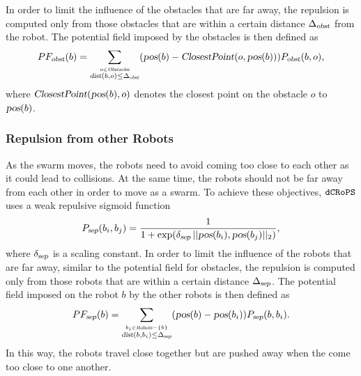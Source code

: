 \documentclass[letterpaper, 10pt, conference]{ieeeconf}
\newcommand{\Acronym}[1]{\ensuremath{{\small{\texttt{#1}}}}}
\newcommand{\Var}[1]{\ensuremath{{\small{\textsl{#1}}}}}
\newcommand{\Name}{\Acronym{dCRoPS}}
\begin{document}

In order to limit the influence of the obstacles that are far away,
the repulsion is computed only from those obstacles that are within a
certain distance $\Delta_\Var{obst}$ from the robot. The potential
field imposed by the obstacles is then defined as 
$$
PF_\Var{obst}(b) = \sum_{\stackrel{o \in
    \Var{Obstacles}}{\Var{dist}(b, o) \leq \Delta_\Var{obst}}} (\Var{pos}(b)
- \Var{ClosestPoint}(o, \Var{pos}(b))) P_\Var{obst}(b, o),
$$
where $\Var{ClosestPoint}(\Var{pos}(b), o)$ denotes the closest point on the
obstacle $o$ to $\Var{pos}(b)$.

\subsubsection{Repulsion from other Robots}
\label{sec:PFrobots} As the swarm moves,
the robots need to avoid coming too close to each other as it
could lead to collisions. At the same time, the robots should not be
far away from each other in order to move as a swarm. To achieve these
objectives, $\Name$ uses a weak repulsive sigmoid function
$$
P_\Var{sep}(b_i, b_j) = \frac{1}{1 +
  \exp(\delta_\Var{sep}\, ||\Var{pos}(b_i), \Var{pos}(b_j)||_2)},
$$
where $\delta_\Var{sep}$ is a scaling constant.
In order to limit the influence of the robots that are far away,
similar to the potential field for obstacles,
the repulsion is computed only from those robots that are within a
certain distance $\Delta_\Var{sep}$. The potential
field imposed on the robot $b$ by the other robots is then defined as 
$$
PF_\Var{sep}(b) = \sum_{\stackrel{b_i \in
    \Var{Robots} - \{b\}}{\Var{dist}(b, b_i) \leq \Delta_\Var{sep}}} (\Var{pos}(b)
- \Var{pos}(b_i)) P_\Var{sep}(b, b_i).
$$
In this way, the robots travel close together but are
pushed away when the come too close to one another.
\end{document}
